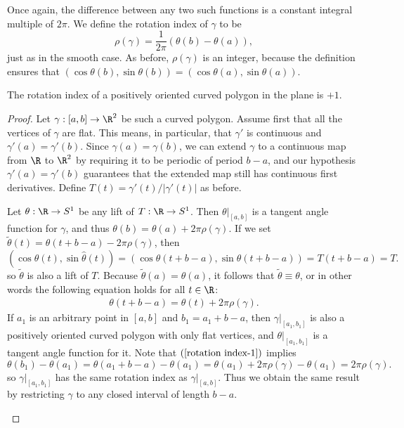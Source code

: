 Once again, the difference between any two such functions is a constant integral multiple 
of $2\pi$. We define the rotation index of $\gamma$ to be
\[\rho(\gamma)=\frac{1}{2\pi}(\theta(b)-\theta(a)),\]
just as in the smooth case. As before, $\rho(\gamma)$ is an integer, because the definition ensures that $(\cos\theta(b),\sin\theta(b))=(\cos\theta(a),\sin\theta(a))$.
\begin{theorem}
The rotation index of a positively oriented curved polygon in the plane is $+1$.
\end{theorem}
\begin{proof}
Let $\gamma:[a,b]\to\R^2$ be such a curved polygon. Assume first that all the vertices of $\gamma$ are flat. This means, in particular, that $\gamma'$ is continuous and $\gamma'(a)=\gamma'(b)$. 
Since $\gamma(a)=\gamma(b)$, we can extend $\gamma$ to a continuous map from $\R$ to $\R^2$ by requiring it to be periodic of period $b-a$, and our hypothesis $\gamma'(a)=\gamma'(b)$ 
guarantees that the extended map still has continuous first derivatives. Define $T(t)=\gamma'(t)/|\gamma'(t)|$ as before.\par
Let $\theta:\R\to S^1$ be any lift of $T:\R\to S^1$. Then $\theta|_{[a,b]}$ is a tangent angle function for $\gamma$, and thus $\theta(b)=\theta(a)+2\pi\rho(\gamma)$. If we set $\tilde{\theta}(t)=\theta(t+b-a)-2\pi\rho(\gamma)$, then
\[(\cos\hat{\theta}(t),\sin\hat{\theta}(t))=(\cos\theta(t+b-a),\sin\theta(t+b-a))=T(t+b-a)=T.\]
so $\tilde{\theta}$ is also a lift of $T$. Because $\tilde{\theta}(a)=\theta(a)$, it follows that $\tilde{\theta}\equiv\theta$, or in other words the following 
equation holds for all $t\in\R$:
\begin{align}\label{rotation index-1}
\theta(t+b-a)=\theta(t)+2\pi\rho(\gamma).
\end{align}
If $a_1$ is an arbitrary point in $[a,b]$ and $b_1=a_1+b-a$, then $\gamma|_{[a_1,b_1]}$ is also a positively oriented curved polygon with only flat vertices, and $\theta|_{[a_1,b_1]}$ 
is a tangent angle function for it. Note that $(\ref{rotation index-1})$ implies
\[\theta(b_1)-\theta(a_1)=\theta(a_1+b-a)-\theta(a_1)=\theta(a_1)+2\pi\rho(\gamma)-\theta(a_1)=2\pi\rho(\gamma).\]
so $\gamma|_{[a_1,b_1]}$ has the same rotation index as $\gamma|_{[a,b]}$. Thus we obtain the same result by restricting $\gamma$ to any closed interval of length $b-a$.
\begin{figure}[htbp]
\centering

\end{figure}
\end{proof}
